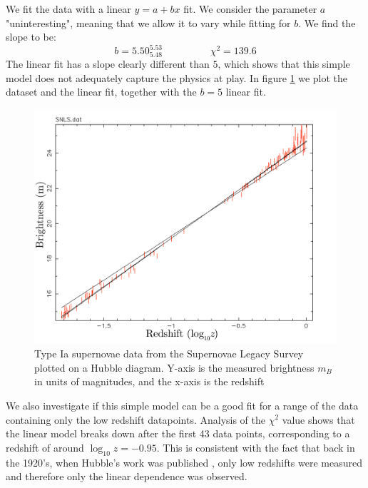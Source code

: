 \documentclass[11pt]{article}
\begin{document}
We fit the data with a linear $y = a + b x$ fit. We consider the parameter $a$ "uninteresting", meaning that we allow it to vary while fitting for $b$. We find the slope to be: 
\begin{equation}
	b = 5.50^{5.53}_{5.48} 
	\hspace{2cm}
	\chi^2 = 139.6
	\label{res:lin}
\end{equation}
The linear fit has a slope clearly different than $5$, which shows that this simple model does not adequately capture the physics at play. In figure \ref{fig:snls} we plot the dataset and the linear fit, together with the $b = 5$ linear fit. 

\begin{figure}[htbp]
	\centering
	\includegraphics[width=0.8\linewidth]{snls.png}
	\caption{Type Ia supernovae data from the Supernovae Legacy Survey plotted on a Hubble diagram. Y-axis is the measured brightness $m_B$ in units of magnitudes, and the x-axis is the redshift}
	\label{fig:snls}
\end{figure}

We also investigate if this simple model can be a good fit for a range of the data containing only the low redshift datapoints. Analysis of the $\chi^2$ value shows that the linear model breaks down after the first 43 data points, corresponding to a redshift of around $\log_{10}z = -0.95$. This is consistent with the fact that back in the 1920's, when Hubble's work was published \cite{Hubble1929}, only low redshifts were measured and therefore only the linear dependence was observed. 
\end{document}
